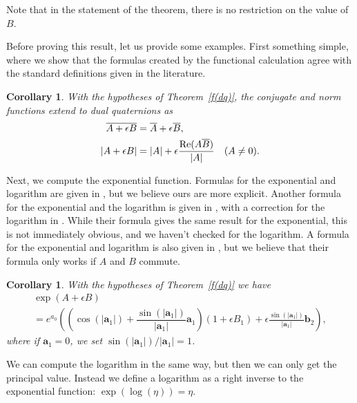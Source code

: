 \documentclass[12pt,reqno]{amsart}
\newtheorem{cor}[theorem]{Corollary}
\begin{document}
Note that in the statement of the theorem, there is no restriction on the value of $B$.

Before proving this result, let us provide some examples.  First something simple, where we show that the formulas created by the functional calculation agree with the standard definitions given in the literature.

\begin{cor}
With the hypotheses of Theorem~\ref{f(dq)}, the conjugate and norm functions extend to dual quaternions as
\begin{align}
\overline{A + \epsilon B} &= \overline{A} + \epsilon \overline{B} ,\\
|A + \epsilon B| &= |A| + \epsilon \frac{\text{\rm Re}(A \overline B)}{|A|} \quad (A \ne 0) .
\end{align}
\end{cor}

Next, we compute the exponential function.  Formulas for the exponential and logarithm are given in \cite{wang-et-al}, but we believe ours are more explicit.  Another formula for the exponential and the logarithm is given in \cite{selig}, with a correction for the logarithm in \cite{wu-et-al}.  While their formula gives the same result for the exponential, this is not immediately obvious, and we haven't checked for the logarithm.  A formula for the exponential and logarithm is also given in \cite{han-et-al}, but we believe that their formula only works if $A$ and $B$ commute.

\begin{cor}
\label{exp dq}
With the hypotheses of Theorem~\ref{f(dq)} we have
\begin{multline}
\label{exp theta}
\exp(A + \epsilon B ) \\
= e^{a_0} \left(\left(\cos(|\bm a_1|) + \dfrac{\sin(|\bm a_1|)}{|\bm a_1|} \bm a_1 \right) \left(1 + \epsilon B_1\right) + \epsilon\frac{\sin(|\bm a_1|)}{|\bm a_1|} \bm b_2\right),
\end{multline}
where if $\bm a_1 = 0$, we set $\sin(|\bm a_1|)/|\bm a_1| = 1$.
\end{cor}

We can compute the logarithm in the same way, but then we can only get the principal value.  Instead we define a logarithm as a right inverse to the exponential function: $\exp(\log(\eta)) = \eta$.
\end{document}
